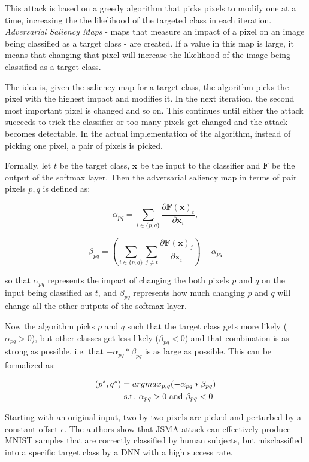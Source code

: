 This attack is based on a greedy algorithm that picks pixels to modify one at a time, increasing the the likelihood of the targeted class in each iteration.  \textit{Adversarial Saliency Maps} - maps that measure an impact of a pixel on an image being classified as a target class - are created. If a value in this map is large, it means that changing that pixel will increase the likelihood of the image being classified as a target class. 

The idea is, given the saliency map for a target class, the algorithm picks the pixel with the highest impact and modifies it. In the next iteration, the second most important pixel is changed and so on. This continues until either the attack succeeds to trick the classifier or too many pixels get changed and the attack becomes detectable. In the actual implementation of the algorithm, instead of picking one pixel, a pair of pixels is picked.

Formally, let $t$ be the target class, $\pmb x$ be the input to the classifier and $\pmb F$ be the output of the softmax layer. Then the adversarial saliency map in terms of pair pixels $p, q$ is defined as:

\[
\alpha_{pq} = \sum_{i \in \{p,q\}} \frac{\partial \pmb F(\pmb x)_t}{\partial \pmb x_i},
\]

\[
\beta_{pq} = ( \sum_{i \in \{p,q\}} \sum_{j \neq t} \frac{\partial \pmb F (\pmb x)_j }{\partial \pmb x _i}) - \alpha_{pq}
\]

so that $\alpha_{pq}$ represents the impact of changing the both pixels $p$ and $q$ on the input being classified as $t$, and $\beta_{pq}$ represents how
much changing $p$ and $q$ will change all the other outputs of the softmax layer.

Now the algorithm picks $p$ and $q$ such that the target class gets more likely ($\alpha_{pq} > 0$), but other classes get less likely ($\beta_{pq} < 0$) and that combination is as strong as possible, i.e. that $ - \alpha_{pq} * \beta_{pq}$ is as large as possible. This can be formalized as:

\begin{align*}
(p^*, q^*) 
				&= arg max_{p, q} (- \alpha_{pq} * \beta_{pq}) \\
                  & \textnormal{ s.t. } \alpha_{pq} > 0 \textnormal{ and } \beta_{pq} < 0
\end{align*}


Starting with an original input, two by two pixels are picked and perturbed by a constant offset $\epsilon$. The authors \cite{DBLP:journals/corr/PapernotMJFCS15} show that JSMA attack can effectively produce MNIST samples that are correctly classified by human subjects, but misclassified into a specific target class by a DNN with a high success rate. 